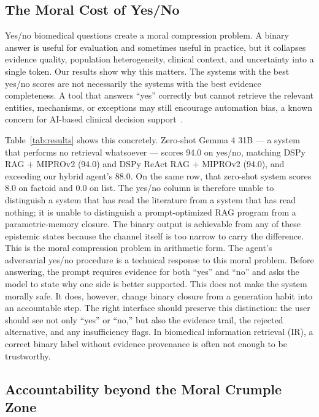 \documentclass[sigconf,anonymous,review]{acmart}
\begin{document}
\subsection{The Moral Cost of Yes/No}

Yes/no biomedical questions create a moral compression problem.
A binary answer is useful for evaluation and sometimes useful in
practice, but it collapses evidence quality, population heterogeneity,
clinical context, and uncertainty into a single token. Our results
show why this matters. The systems with the best yes/no scores are
not necessarily the systems with the best evidence completeness.
A tool that answers ``yes'' correctly but cannot retrieve the relevant
entities, mechanisms, or exceptions may still encourage automation
bias, a known concern for AI-based clinical decision support~\cite{abdelwanis2024automation,khera2023automation}.

Table~\ref{tab:results} shows this concretely. Zero-shot Gemma 4
31B --- a system that performs no retrieval whatsoever --- scores
94.0 on yes/no, matching DSPy RAG + MIPROv2 (94.0) and DSPy
ReAct RAG + MIPROv2 (94.0), and exceeding our hybrid agent's
88.0. On the same row, that zero-shot system scores 8.0 on factoid
and 0.0 on list. The yes/no column is therefore unable to distinguish
a system that has read the literature from a system that has read
nothing; it is unable to distinguish a prompt-optimized RAG program from a parametric-memory closure. The binary output is achievable from any of these epistemic states because the channel itself
is too narrow to carry the difference. This is the moral compression
problem in arithmetic form. The agent's adversarial yes/no procedure is a technical response to this moral problem. Before answering, the
prompt requires evidence for both ``yes'' and ``no'' and asks the
model to state why one side is better supported. This does not make
the system morally safe. It does, however, change binary closure
from a generation habit into an accountable step. The right interface
should preserve this distinction: the user should see not only ``yes''
or ``no,'' but also the evidence trail, the rejected alternative, and
any insufficiency flags. In biomedical information retrieval (IR),
a correct binary label without evidence provenance is often not
enough to be trustworthy.

\subsection{Accountability beyond the Moral Crumple
Zone}
\end{document}
